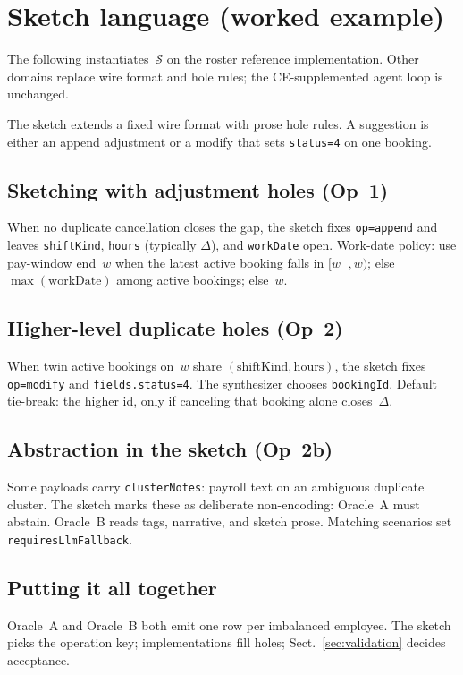 \documentclass[11pt]{article}
\begin{document}
\section{Sketch language (worked example)}
\label{sec:sketch-lang}

The following instantiates~$\mathcal{S}$ on the roster reference implementation.
Other domains replace wire format and hole rules; the CE-supplemented agent loop is unchanged.

The sketch extends a fixed wire format with prose hole rules. A suggestion is either an
append adjustment or a modify that sets \texttt{status=4} on one booking.

\subsection{Sketching with adjustment holes (Op~1)}
When no duplicate cancellation closes the gap, the sketch fixes \texttt{op=append} and
leaves \texttt{shiftKind}, \texttt{hours} (typically $\Delta$), and \texttt{workDate} open.
Work-date policy: use pay-window end~$w$ when the latest active booking falls in
$[w^-, w)$; else $\max(\mathrm{workDate})$ among active bookings; else~$w$.

\subsection{Higher-level duplicate holes (Op~2)}
When twin active bookings on~$w$ share $(\mathrm{shiftKind}, \mathrm{hours})$, the sketch
fixes \texttt{op=modify} and \texttt{fields.status=4}. The synthesizer chooses
\texttt{bookingId}. Default tie-break: the higher id, only if canceling that booking alone
closes~$\Delta$.

\subsection{Abstraction in the sketch (Op~2b)}
Some payloads carry \texttt{clusterNotes}: payroll text on an ambiguous duplicate cluster.
The sketch marks these as deliberate non-encoding: Oracle~A must abstain. Oracle~B reads
tags, narrative, and sketch prose. Matching scenarios set \texttt{requiresLlmFallback}.

\subsection{Putting it all together}
Oracle~A and Oracle~B both emit one row per imbalanced employee. The sketch picks the
operation key; implementations fill holes; Sect.~\ref{sec:validation} decides acceptance.
\end{document}

